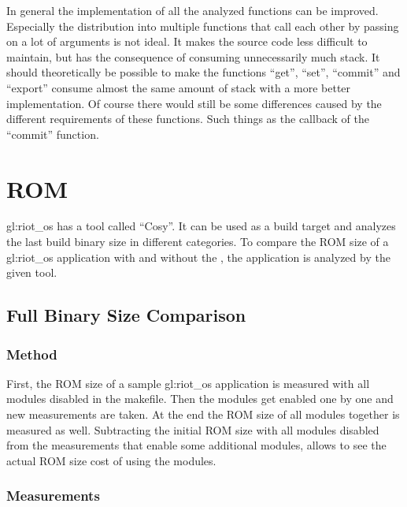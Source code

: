 In general the implementation of all the analyzed functions can be improved.
Especially the distribution into multiple functions that call each other by passing on a lot of arguments is not ideal.
It makes the source code less difficult to maintain, but has the consequence of consuming unnecessarily much stack.
It should theoretically be possible to make the functions ``get'', ``set'', ``commit'' and ``export'' consume almost the same amount of stack with a more better implementation.
Of course there would still be some differences caused by the different requirements of these functions. Such things as the callback of the ``commit'' function.

\section{ROM}
\label{sec:evaluation:rom_overhead}

\gls{gl:riot_os} has a tool called ``Cosy''.
It can be used as a build target and analyzes the last build binary size in different categories.
To compare the ROM size of a \gls{gl:riot_os} application with and without the , the application is analyzed by the given tool.

\subsection{Full Binary Size Comparison}

\subsubsection{Method}

First, the ROM size of a sample \gls{gl:riot_os} application is measured with all  modules disabled in the makefile.
Then the  modules get enabled one by one and new measurements are taken. At the end the ROM size of all modules together is measured as well.
Subtracting the initial ROM size with all  modules disabled from the measurements that enable some additional  modules, allows to see the actual ROM size cost of using the  modules.

\subsubsection{Measurements}

